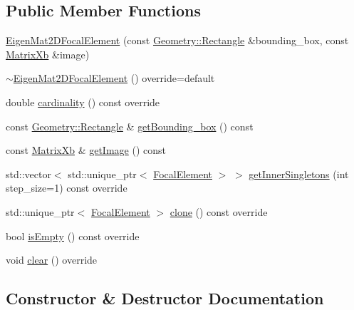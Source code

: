 \subsection*{Public Member Functions}
\begin{DoxyCompactItemize}
\item 
\hyperlink{classEigenFE_1_1EigenMat2DFocalElement_ab1e04c916b081d4ac8f65c071619f2ae}{Eigen\+Mat2\+D\+Focal\+Element} (const \hyperlink{classGeometry_1_1Rectangle}{Geometry\+::\+Rectangle} \&bounding\+\_\+box, const \hyperlink{namespaceEigenFE_a478c1c0c93aef88b798e7c38a9c65d59}{Matrix\+Xb} \&image)
\item 
\hyperlink{classEigenFE_1_1EigenMat2DFocalElement_a8d16fd73bfb48a9cce07e6e8ea5cb83d}{$\sim$\+Eigen\+Mat2\+D\+Focal\+Element} () override=default
\item 
double \hyperlink{classEigenFE_1_1EigenMat2DFocalElement_ac19a1317772f2946bd8956cb084a3a1b}{cardinality} () const override
\item 
const \hyperlink{classGeometry_1_1Rectangle}{Geometry\+::\+Rectangle} \& \hyperlink{classEigenFE_1_1EigenMat2DFocalElement_a87b3b927b9b669c4120efb6c271a14d6}{get\+Bounding\+\_\+box} () const 
\item 
const \hyperlink{namespaceEigenFE_a478c1c0c93aef88b798e7c38a9c65d59}{Matrix\+Xb} \& \hyperlink{classEigenFE_1_1EigenMat2DFocalElement_a50caa5018108e7c376c313c8c301165d}{get\+Image} () const 
\item 
std\+::vector$<$ std\+::unique\+\_\+ptr$<$ \hyperlink{classFocalElement}{Focal\+Element} $>$ $>$ \hyperlink{classEigenFE_1_1EigenMat2DFocalElement_a02348604649107935c95106b1fb18a06}{get\+Inner\+Singletons} (int step\+\_\+size=1) const override
\item 
std\+::unique\+\_\+ptr$<$ \hyperlink{classFocalElement}{Focal\+Element} $>$ \hyperlink{classEigenFE_1_1EigenMat2DFocalElement_a7b11a9c1a340338ddc0502c04c3ebb50}{clone} () const override
\item 
bool \hyperlink{classEigenFE_1_1EigenMat2DFocalElement_af0b7bcf11590355059f49c59c51aea3f}{is\+Empty} () const override
\item 
void \hyperlink{classEigenFE_1_1EigenMat2DFocalElement_a32f67417ea35cb7d330d8ca27472c863}{clear} () override
\end{DoxyCompactItemize}


\subsection{Constructor \& Destructor Documentation}
\hypertarget{classEigenFE_1_1EigenMat2DFocalElement_ab1e04c916b081d4ac8f65c071619f2ae}{}
